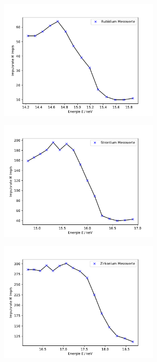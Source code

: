 \begin{figure}
    \centering
    \includegraphics[width=0.7\textwidth]{plots/Rubidium.pdf}
    \caption{}
\end{figure}
\begin{figure}
    \centering
    \includegraphics[width=0.7\textwidth]{plots/Strontium.pdf}
    \caption{}
\end{figure}
\begin{figure}
    \centering
    \includegraphics[width=0.7\textwidth]{plots/Zirkonium.pdf}
    \caption{}
\end{figure}
\label{sec:anhang}


